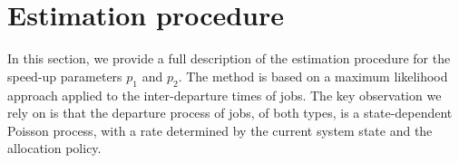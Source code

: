 \documentclass[11pt]{article}
\theoremstyle{remark}
\theoremstyle{definition}
\numberwithin{equation}{section}
\begin{document}







\section{Estimation procedure} \label{section: estimation procedure}

In this section, we provide a full description of the estimation procedure for the speed-up parameters $p_1$ and $p_2$. The method is based on a maximum likelihood approach applied to the inter-departure times of jobs.
The key observation we rely on is that the departure process of jobs, of both types, is a state-dependent Poisson process, with a rate determined by the current system state and the allocation policy. 
\end{document}
